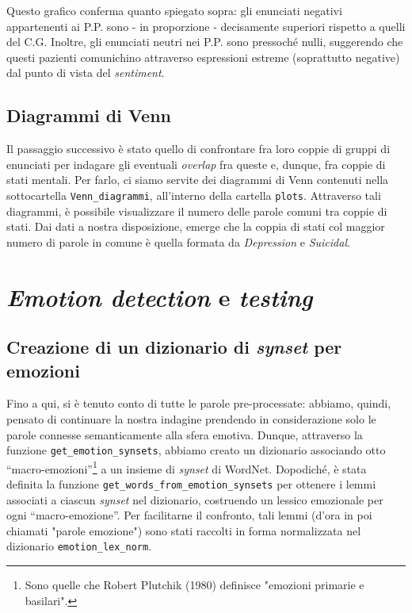 \documentclass[11pt]{article}
\begin{document}
Questo grafico conferma quanto spiegato sopra: gli enunciati negativi appartenenti ai P.P. sono - in proporzione - decisamente superiori rispetto a quelli del C.G. Inoltre, gli enunciati neutri nei P.P. sono pressoché nulli, suggerendo che questi pazienti comunichino attraverso espressioni estreme (soprattutto negative) dal punto di vista del \textit{sentiment}. 

\subsection{Diagrammi di Venn}
\label{ssec:layout}

Il passaggio successivo è stato quello di confrontare fra loro coppie di gruppi di enunciati per indagare gli eventuali \textit{overlap} fra queste e, dunque, fra coppie di stati mentali.   Per farlo, ci siamo servite dei diagrammi di Venn contenuti nella sottocartella \texttt{Venn\_diagrammi}, all’interno della cartella \texttt{plots}. Attraverso tali diagrammi, è possibile visualizzare il numero delle parole comuni tra coppie di stati. Dai dati a nostra disposizione, emerge che la coppia di stati col maggior numero di parole in comune è quella formata da \textit{Depression} e \textit{Suicidal}.

\section{\textit{\textit{Emotion detection}} e \textit{testing}}
\subsection{Creazione di un dizionario di \textit{synset} per emozioni}
\label{ssec:layout}

Fino a qui, si è tenuto conto di tutte le parole pre-processate: abbiamo, quindi, pensato di continuare la nostra indagine prendendo in considerazione solo le parole connesse semanticamente alla sfera emotiva. Dunque, attraverso la funzione \texttt{get\_emotion\_synsets}, abbiamo creato un dizionario associando otto “macro-emozioni”\footnote{Sono quelle che Robert Plutchik (1980) definisce "emozioni primarie e basilari".} a un insieme di \textit{synset} di WordNet. Dopodiché, è stata definita la funzione \texttt{get\_words\_from\_emotion\_synsets} per ottenere i lemmi associati a ciascun \textit{synset} nel dizionario, costruendo un lessico emozionale per ogni “macro-emozione”. Per facilitarne il confronto, tali lemmi (d'ora in poi chiamati "parole emozione") sono stati raccolti in forma normalizzata nel dizionario \texttt{emotion\_lex\_norm}.
\end{document}
